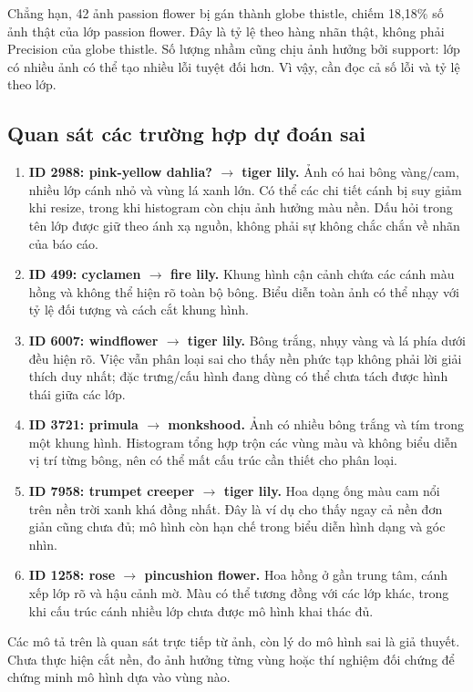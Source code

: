 
Chẳng hạn, 42 ảnh passion flower bị gán thành globe thistle, chiếm 18,18\% số ảnh thật của lớp passion flower. Đây là tỷ lệ theo hàng nhãn thật, không phải Precision của globe thistle. Số lượng nhầm cũng chịu ảnh hưởng bởi support: lớp có nhiều ảnh có thể tạo nhiều lỗi tuyệt đối hơn. Vì vậy, cần đọc cả số lỗi và tỷ lệ theo lớp.

\subsection{Quan sát các trường hợp dự đoán sai}
\begin{enumerate}
\item \textbf{ID 2988: pink-yellow dahlia? \(\rightarrow\) tiger lily.} Ảnh có hai bông vàng/cam, nhiều lớp cánh nhỏ và vùng lá xanh lớn. Có thể các chi tiết cánh bị suy giảm khi resize, trong khi histogram còn chịu ảnh hưởng màu nền. Dấu hỏi trong tên lớp được giữ theo ánh xạ nguồn, không phải sự không chắc chắn về nhãn của báo cáo.
\item \textbf{ID 499: cyclamen \(\rightarrow\) fire lily.} Khung hình cận cảnh chứa các cánh màu hồng và không thể hiện rõ toàn bộ bông. Biểu diễn toàn ảnh có thể nhạy với tỷ lệ đối tượng và cách cắt khung hình.
\item \textbf{ID 6007: windflower \(\rightarrow\) tiger lily.} Bông trắng, nhụy vàng và lá phía dưới đều hiện rõ. Việc vẫn phân loại sai cho thấy nền phức tạp không phải lời giải thích duy nhất; đặc trưng/cấu hình đang dùng có thể chưa tách được hình thái giữa các lớp.
\item \textbf{ID 3721: primula \(\rightarrow\) monkshood.} Ảnh có nhiều bông trắng và tím trong một khung hình. Histogram tổng hợp trộn các vùng màu và không biểu diễn vị trí từng bông, nên có thể mất cấu trúc cần thiết cho phân loại.
\item \textbf{ID 7958: trumpet creeper \(\rightarrow\) tiger lily.} Hoa dạng ống màu cam nổi trên nền trời xanh khá đồng nhất. Đây là ví dụ cho thấy ngay cả nền đơn giản cũng chưa đủ; mô hình còn hạn chế trong biểu diễn hình dạng và góc nhìn.
\item \textbf{ID 1258: rose \(\rightarrow\) pincushion flower.} Hoa hồng ở gần trung tâm, cánh xếp lớp rõ và hậu cảnh mờ. Màu có thể tương đồng với các lớp khác, trong khi cấu trúc cánh nhiều lớp chưa được mô hình khai thác đủ.
\end{enumerate}
Các mô tả trên là quan sát trực tiếp từ ảnh, còn lý do mô hình sai là giả thuyết. Chưa thực hiện cắt nền, đo ảnh hưởng từng vùng hoặc thí nghiệm đối chứng để chứng minh mô hình dựa vào vùng nào.

